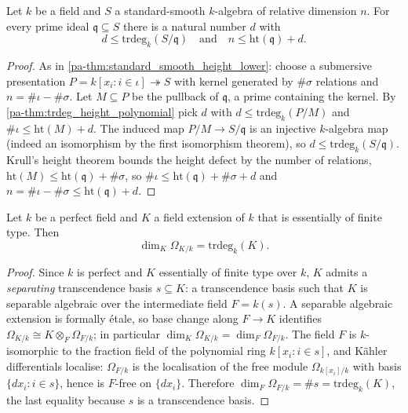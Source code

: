 \begin{theorem}
  \label{pa-thm:trdeg_height_standard_smooth}
  \leanok

  Let \(k\) be a field and \(S\) a standard-smooth \(k\)-algebra of relative dimension
  \(n\). For every prime ideal \(\mathfrak q \subseteq S\) there is a natural number
  \(d\) with
  \[
    d \leq \mathrm{trdeg}_k(S/\mathfrak q)
    \quad\text{and}\quad
    n \leq \mathrm{ht}(\mathfrak q) + d.
  \]
\end{theorem}
\begin{proof}
  \leanok
  As in \ref{pa-thm:standard_smooth_height_lower}: choose a submersive presentation
  \(P = k[x_i : i \in \iota] \twoheadrightarrow S\) with kernel generated by
  \(\#\sigma\) relations and \(n = \#\iota - \#\sigma\). Let \(M \subseteq P\) be the
  pullback of \(\mathfrak q\), a prime containing the kernel. By
  \ref{pa-thm:trdeg_height_polynomial} pick \(d\) with \(d \leq \mathrm{trdeg}_k(P/M)\) and
  \(\#\iota \leq \mathrm{ht}(M) + d\). The induced map \(P/M \to S/\mathfrak q\) is an
  injective \(k\)-algebra map (indeed an isomorphism by the first isomorphism theorem),
  so \(d \leq \mathrm{trdeg}_k(S/\mathfrak q)\). Krull's height theorem bounds the
  height defect by the number of relations,
  \(\mathrm{ht}(M) \leq \mathrm{ht}(\mathfrak q) + \#\sigma\), so
  \(\#\iota \leq \mathrm{ht}(\mathfrak q) + \#\sigma + d\) and
  \(n = \#\iota - \#\sigma \leq \mathrm{ht}(\mathfrak q) + d\).
\end{proof}

\begin{theorem}
  \label{pa-thm:kaehler_rank_trdeg}
  \leanok

  Let \(k\) be a perfect field and \(K\) a field extension of \(k\) that is essentially
  of finite type. Then
  \[
    \dim_K \Omega_{K/k} = \mathrm{trdeg}_k(K).
  \]
\end{theorem}
\begin{proof}
  \leanok
  Since \(k\) is perfect and \(K\) essentially of finite type over \(k\), \(K\) admits a
  \emph{separating} transcendence basis \(s \subseteq K\): a transcendence basis such
  that \(K\) is separable algebraic over the intermediate field \(F = k(s)\). A
  separable algebraic extension is formally \'etale, so base change along \(F \to K\)
  identifies \(\Omega_{K/k} \cong K \otimes_F \Omega_{F/k}\); in particular
  \(\dim_K \Omega_{K/k} = \dim_F \Omega_{F/k}\). The field \(F\) is \(k\)-isomorphic to
  the fraction field of the polynomial ring \(k[x_i : i \in s]\), and K\"ahler
  differentials localise: \(\Omega_{F/k}\) is the localisation of the free module
  \(\Omega_{k[x_i]/k}\) with basis \(\{dx_i : i \in s\}\), hence is \(F\)-free on
  \(\{dx_i\}\). Therefore
  \(\dim_F \Omega_{F/k} = \#s = \mathrm{trdeg}_k(K)\), the last equality because \(s\)
  is a transcendence basis.
\end{proof}

